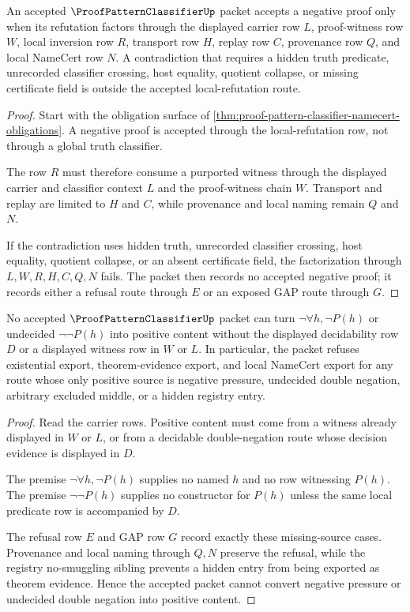 \begin{theorem}
\label{thm:proof-pattern-classifier-local-refutation-boundary}
An accepted $\ProofPatternClassifierUp$ packet accepts a negative proof only when its refutation factors through the displayed carrier row $L$, proof-witness row $W$, local inversion row $R$, transport row $H$, replay row $C$, provenance row $Q$, and local NameCert row $N$. A contradiction that requires a hidden truth predicate, unrecorded classifier crossing, host equality, quotient collapse, or missing certificate field is outside the accepted local-refutation route.
\end{theorem}
\begin{proof}
Start with the obligation surface of \autoref{thm:proof-pattern-classifier-namecert-obligations}. A negative proof is accepted through the local-refutation row, not through a global truth classifier.

The row $R$ must therefore consume a purported witness through the displayed carrier and classifier context $L$ and the proof-witness chain $W$. Transport and replay are limited to $H$ and $C$, while provenance and local naming remain $Q$ and $N$.

If the contradiction uses hidden truth, unrecorded classifier crossing, host equality, quotient collapse, or an absent certificate field, the factorization through $L,W,R,H,C,Q,N$ fails. The packet then records no accepted negative proof; it records either a refusal route through $E$ or an exposed GAP route through $G$.
\end{proof}

\begin{theorem}
\label{thm:proof-pattern-classifier-positive-extraction-refusal}
No accepted $\ProofPatternClassifierUp$ packet can turn $\neg\forall h,\neg P(h)$ or undecided $\neg\neg P(h)$ into positive content without the displayed decidability row $D$ or a displayed witness row in $W$ or $L$. In particular, the packet refuses existential export, theorem-evidence export, and local NameCert export for any route whose only positive source is negative pressure, undecided double negation, arbitrary excluded middle, or a hidden registry entry.
\end{theorem}
\begin{proof}
Read the carrier rows. Positive content must come from a witness already displayed in $W$ or $L$, or from a decidable double-negation route whose decision evidence is displayed in $D$.

The premise $\neg\forall h,\neg P(h)$ supplies no named $h$ and no row witnessing $P(h)$. The premise $\neg\neg P(h)$ supplies no constructor for $P(h)$ unless the same local predicate row is accompanied by $D$.

The refusal row $E$ and GAP row $G$ record exactly these missing-source cases. Provenance and local naming through $Q,N$ preserve the refusal, while the registry no-smuggling sibling prevents a hidden entry from being exported as theorem evidence. Hence the accepted packet cannot convert negative pressure or undecided double negation into positive content.
\end{proof}

